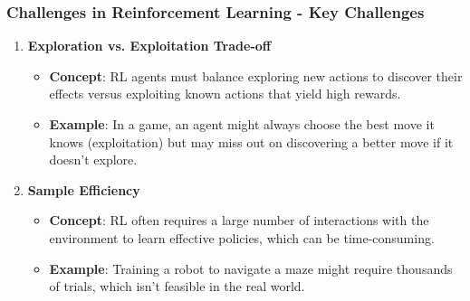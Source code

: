 \documentclass[aspectratio=169]{beamer}
\begin{document}
\begin{frame}[fragile]
  \frametitle{Challenges in Reinforcement Learning - Key Challenges}
  \begin{enumerate}
    \item \textbf{Exploration vs. Exploitation Trade-off}
    \begin{itemize}
      \item \textbf{Concept}: RL agents must balance exploring new actions to discover their effects versus exploiting known actions that yield high rewards.
      \item \textbf{Example}: In a game, an agent might always choose the best move it knows (exploitation) but may miss out on discovering a better move if it doesn't explore.
    \end{itemize}
    
    \item \textbf{Sample Efficiency}
    \begin{itemize}
      \item \textbf{Concept}: RL often requires a large number of interactions with the environment to learn effective policies, which can be time-consuming.
      \item \textbf{Example}: Training a robot to navigate a maze might require thousands of trials, which isn't feasible in the real world.
    \end{itemize}
  \end{enumerate}
\end{frame}
\end{document}
